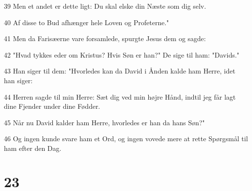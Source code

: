 \par 39 Men et andet er dette ligt: Du skal elske din Næste som dig selv.
\par 40 Af disse to Bud afhænger hele Loven og Profeterne."
\par 41 Men da Farisæerne vare forsamlede, spurgte Jesus dem og sagde:
\par 42 "Hvad tykkes eder om Kristus? Hvis Søn er han?" De sige til ham: "Davids."
\par 43 Han siger til dem: "Hvorledes kan da David i Ånden kalde ham Herre, idet han siger:
\par 44 Herren sagde til min Herre: Sæt dig ved min højre Hånd, indtil jeg får lagt dine Fjender under dine Fødder.
\par 45 Når nu David kalder ham Herre, hvorledes er han da hans Søn?"
\par 46 Og ingen kunde svare ham et Ord, og ingen vovede mere at rette Spørgsmål til ham efter den Dag.

\chapter{23}

